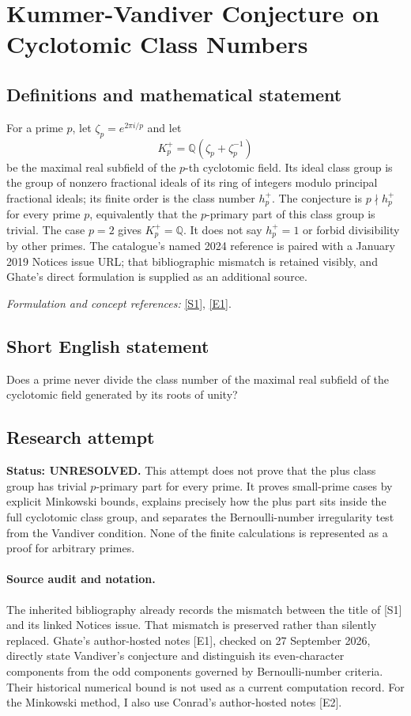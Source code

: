 \documentclass[11pt]{article}
\begin{document}
\section*{\texorpdfstring{Kummer-Vandiver Conjecture on Cyclotomic Class Numbers}{Kummer-Vandiver Conjecture on Cyclotomic Class Numbers}}\label{353}
\subsection{Definitions and mathematical statement}
For a prime $p$, let $\zeta_p=e^{2\pi i/p}$ and let
\[
 K_p^+={\mathbb{Q}}(\zeta_p+\zeta_p^{-1})
\]
be the maximal real subfield of the $p$-th cyclotomic field. Its ideal class group is the group of nonzero fractional ideals of its ring of integers modulo principal fractional ideals; its finite order is the class number $h_p^+$. The conjecture is $p\nmid h_p^+$ for every prime $p$, equivalently that the $p$-primary part of this class group is trivial. The case $p=2$ gives $K_p^+={\mathbb{Q}}$. It does not say $h_p^+=1$ or forbid divisibility by other primes. The catalogue's named 2024 reference is paired with a January 2019 Notices issue URL; that bibliographic mismatch is retained visibly, and Ghate's direct formulation is supplied as an additional source.
\par\smallskip\textit{Formulation and concept references:} \href{https://www.ams.org/journals/notices/201901/201901FullIssue.pdf}{[S1]}, \href{https://mathweb.tifr.res.in/~eghate/vandiver.pdf}{[E1]}.

\subsection{Short English statement}
Does a prime never divide the class number of the maximal real subfield of the cyclotomic field generated by its roots of unity?
\subsection{Research attempt}
\textbf{Status: UNRESOLVED.} This attempt does not prove that the plus class group has trivial $p$-primary part for every prime. It proves small-prime cases by explicit Minkowski bounds, explains precisely how the plus part sits inside the full cyclotomic class group, and separates the Bernoulli-number irregularity test from the Vandiver condition. None of the finite calculations is represented as a proof for arbitrary primes.

\paragraph{Source audit and notation.}
The inherited bibliography already records the mismatch between the title of [S1] and its linked Notices issue. That mismatch is preserved rather than silently replaced. Ghate's author-hosted notes [E1], checked on 27 September 2026, directly state Vandiver's conjecture and distinguish its even-character components from the odd components governed by Bernoulli-number criteria. Their historical numerical bound is not used as a current computation record. For the Minkowski method, I also use Conrad's author-hosted notes [E2].
\end{document}

